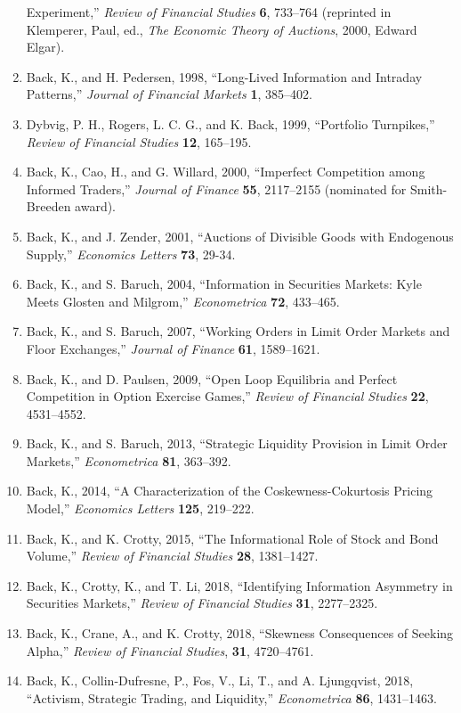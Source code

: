 \documentclass[11pt]{article}
\begin{document}
\begin{enumerate}
Experiment,'' {\em Review of Financial Studies\/}
{\bf 6}, 733--764 (reprinted in Klemperer, Paul, ed., {\em The Economic Theory of Auctions}, 2000, Edward Elgar).
\item Back, K., and H. Pedersen, 1998, ``Long-Lived Information and Intraday Patterns,'' {\em Journal of Financial Markets\/}
{\bf 1}, 385--402.
\item Dybvig, P. H., Rogers, L. C. G., and K. Back, 1999,
``Portfolio Turnpikes,'' {\em Review of Financial Studies\/} {\bf 12}, 165--195.
\item Back, K., Cao, H., and G. Willard, 2000, ``Imperfect Competition
among Informed Traders,'' {\em Journal of Finance\/} {\bf 55}, 2117--2155 (nominated for Smith-Breeden award).
\item Back, K., and J. Zender, 2001, ``Auctions of Divisible Goods with Endogenous Supply,'' {\em Economics Letters\/} {\bf 73}, 29-34.
\item Back, K., and S. Baruch, 2004, ``Information in Securities Markets: Kyle Meets Glosten and Milgrom,'' \textit{Econometrica} \textbf{72}, 433--465.
\item Back, K., and S. Baruch, 2007, ``Working Orders in Limit Order Markets and Floor Exchanges,'' \textit{Journal of Finance} \textbf{61}, 1589--1621.
\item Back, K., and D. Paulsen, 2009, ``Open Loop Equilibria and Perfect Competition in Option Exercise Games,'' \textit{Review of Financial Studies} \textbf{22}, 4531--4552.
\item Back, K., and S. Baruch, 2013, ``Strategic Liquidity Provision in Limit Order Markets,'' \textit{Econometrica} \textbf{81}, 363--392.
\item Back, K., 2014, ``A Characterization of the Coskewness-Cokurtosis Pricing Model,'' \textit{Economics Letters} \textbf{125}, 219--222.  
\item Back, K., and K. Crotty, 2015, ``The Informational Role of Stock and Bond Volume,'' \textit{Review of Financial Studies} \textbf{28}, 1381--1427.
\item Back, K., Crotty, K., and T. Li, 2018, ``Identifying Information Asymmetry in Securities Markets,'' \textit{Review of Financial Studies} \textbf{31}, 2277--2325.
\item Back, K., Crane, A., and K. Crotty, 2018, ``Skewness Consequences of Seeking Alpha,'' \textit{Review of Financial Studies}, \textbf{31}, 4720--4761.
\item Back, K., Collin-Dufresne, P., Fos, V., Li, T., and A. Ljungqvist, 2018, ``Activism, Strategic Trading, and Liquidity,'' \textit{Econometrica} \textbf{86}, 1431--1463.

\end{enumerate}
\end{document}
